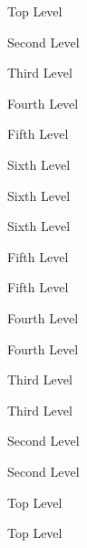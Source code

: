 \begin{outline}
\item{Top Level}
\begin{outline}
\item{Second Level}
\begin{outline}
\item{Third Level}
\begin{outline}
\item{Fourth Level}
\begin{outline}
\item{Fifth Level}
\begin{outline}
\item{Sixth Level}
\item{Sixth Level}
\item{Sixth Level}
\end{outline}
\item{Fifth Level}
\item{Fifth Level}
\end{outline}
\item{Fourth Level}
\item{Fourth Level}
\end{outline}
\item{Third Level}
\item{Third Level}
\end{outline}
\item{Second Level}
\item{Second Level}
\end{outline}
\item{Top Level}
\item{Top Level}
\end{outline}

